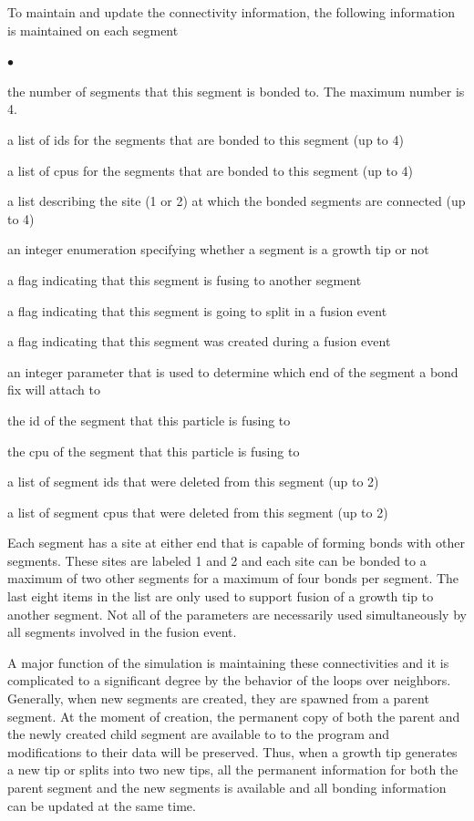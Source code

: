 \documentclass[12pt]{article}
\begin{document}
To maintain and update the connectivity information, the following information is maintained
on each segment
\begin{list}{$\bullet$}{}
\item the number of segments that this segment is bonded to. The maximum number is 4.
\item a list of ids for the segments that are bonded to this segment (up to 4)
\item a list of cpus for the segments that are bonded to this segment (up to 4)
\item a list describing the site (1 or 2) at which the bonded segments are connected (up to 4)
\item an integer enumeration specifying whether a segment is a growth tip or not
\item a flag indicating that this segment is fusing to another segment
\item a flag indicating that this segment is going to split in a fusion event
\item a flag indicating that this segment was created during a fusion event
\item an integer parameter that is used to determine which end of the segment a bond fix will
attach to
\item the id of the segment that this particle is fusing to
\item the cpu of the segment that this particle is fusing to
\item a list of segment ids that were deleted from this segment (up to 2)
\item a list of segment cpus that were deleted from this segment (up to 2)
\end{list}
Each segment has a site at either end that is capable of forming bonds with other segments.
These sites are labeled 1 and 2 and each site can be bonded to a maximum of two other segments
for a maximum of four bonds per segment. The last eight items in the list are only used to
support fusion of a growth tip to another segment. Not all of the parameters are necessarily
used simultaneously by all segments involved in the fusion event.

A major function of the simulation is maintaining these connectivities and it is complicated
to a significant degree by the behavior of the loops over neighbors. Generally, when new
segments are created, they are spawned from a parent segment. At the moment of creation,
the permanent copy of both the parent and the newly created child segment are available to
to the program and modifications to their data will be preserved. Thus, when a growth tip
generates a new tip or splits into two new tips, all the permanent information for both the
parent segment and the new segments is available and all bonding information can be updated
at the same time.
\end{document}
